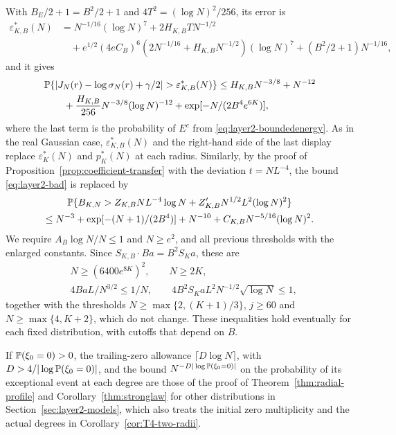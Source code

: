 With $B_E/2+1=B^2/2+1$ and $4T^2=(\log N)^2/256$, its error is
\begin{align*}
 \varepsilon_{K,B}^*(N)
 &=N^{-1/16}(\log N)^7+2H_{K,B}TN^{-1/2}\\
 &\quad +e^{1/2}(4eC_B)^6(2N^{-1/16}+H_{K,B}N^{-1/2})(\log N)^7
 +(B^2/2+1)N^{-1/16},
\end{align*}
and it gives
\begin{align*}
 &\Prob\{|J_N(r)-\log\sigma_N(r)+\gamma/2|>\varepsilon_{K,B}^*(N)\}
 \le H_{K,B}N^{-3/8}+N^{-12}\\
 &\qquad+\frac{H_{K,B}}{256}N^{-3/8}(\log N)^{-12}
 +\exp[-N/(2B^4e^{6K})],
\end{align*}
where the last term is the probability of $E^c$ from
\eqref{eq:layer2-boundedenergy}.
As in the real Gaussian case, $\varepsilon_{K,B}^*(N)$ and the right-hand
side of the last display replace $\varepsilon_K^*(N)$ and $p_K^*(N)$ at
each radius.
Similarly, by the proof of Proposition~\ref{prop:coefficient-transfer}
with the deviation $t=NL^{-4}$, the bound \eqref{eq:layer2-bad} is
replaced by
\begin{multline*}
 \mathbb P\{B_{K,N}>Z_{K,B}NL^{-4}\log N+Z'_{K,B}N^{1/2}L^2(\log N)^2\}\\
 \le N^{-3}+\exp[-(N+1)/(2B^4)]+N^{-10}+C_{K,B}N^{-5/16}(\log N)^2.
\end{multline*}
We require $A_B\log N/N\le1$ and $N\ge e^2$, and all previous thresholds
with the enlarged constants.
Since $S_{K,B}\cdot Ba=B^2S_Ka$, these are
\begin{align*}
 &N\ge(6400e^{8K})^2,\qquad N\ge2K,\\
 &4BaL/N^{3/2}\le1/N,\qquad
  4B^2S_KaL^2N^{-1/2}\sqrt{\log N}\le1,
\end{align*}
together with the thresholds $N\ge\max\{2,(K+1)/3\}$, $j\ge60$ and
$N\ge\max\{4,K+2\}$, which do not change.
These inequalities hold eventually for each fixed distribution, with
cutoffs that depend on $B$.

If $\mathbb P(\xi_0=0)>0$, the trailing-zero allowance $\lceil D\log N\rceil$,
with $D>4/|\log\mathbb P(\xi_0=0)|$, and the bound
$N^{-D|\log\mathbb P(\xi_0=0)|}$ on the probability of its exceptional event
at each degree are those of the proof of
Theorem~\ref{thm:radial-profile} and Corollary~\ref{thm:stronglaw} for
other distributions in Section~\ref{sec:layer2-models}, which also
treats the initial zero multiplicity and the actual degrees in
Corollary~\ref{cor:T4-two-radii}.


